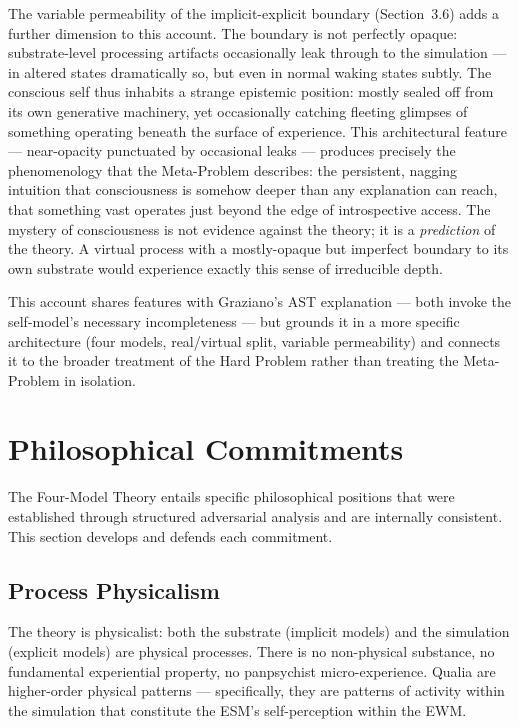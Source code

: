 \documentclass[12pt]{article}
\begin{document}
The variable permeability of the implicit-explicit boundary (Section~3.6) adds a further dimension to this account. The boundary is not perfectly opaque: substrate-level processing artifacts occasionally leak through to the simulation --- in altered states dramatically so, but even in normal waking states subtly. The conscious self thus inhabits a strange epistemic position: mostly sealed off from its own generative machinery, yet occasionally catching fleeting glimpses of something operating beneath the surface of experience. This architectural feature --- near-opacity punctuated by occasional leaks --- produces precisely the phenomenology that the Meta-Problem describes: the persistent, nagging intuition that consciousness is somehow deeper than any explanation can reach, that something vast operates just beyond the edge of introspective access. The mystery of consciousness is not evidence against the theory; it is a \emph{prediction} of the theory. A virtual process with a mostly-opaque but imperfect boundary to its own substrate would experience exactly this sense of irreducible depth.

This account shares features with Graziano's AST explanation --- both invoke the self-model's necessary incompleteness --- but grounds it in a more specific architecture (four models, real/virtual split, variable permeability) and connects it to the broader treatment of the Hard Problem rather than treating the Meta-Problem in isolation.



\section{Philosophical Commitments}


The Four-Model Theory entails specific philosophical positions that were established through structured adversarial analysis and are internally consistent. This section develops and defends each commitment.


\subsection{Process Physicalism}


The theory is physicalist: both the substrate (implicit models) and the simulation (explicit models) are physical processes. There is no non-physical substance, no fundamental experiential property, no panpsychist micro-experience. Qualia are higher-order physical patterns --- specifically, they are patterns of activity within the simulation that constitute the ESM's self-perception within the EWM.
\end{document}
